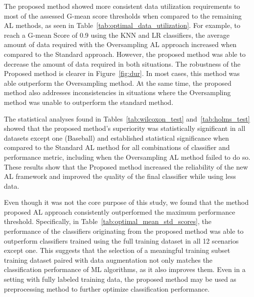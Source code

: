 \documentclass[preprint, 12pt]{elsarticle}
\begin{document}
The proposed method showed more consistent data utilization requirements to
most of the assessed G-mean score thresholds when compared to the remaining AL
methods, as seen in Table~\ref{tab:optimal_data_utilization}. For example, to
reach a G-mean Score of 0.9 using the KNN and LR classifiers, the average
amount of data required with the Oversampling AL approach increased when
compared to the Standard approach. However, the proposed method was able to
decrease the amount of data required in both situations. The robustness of the
Proposed method is clearer in Figure~\ref{fig:dur}. In most cases, this method
was able outperform the Oversampling method. At the same time, the
proposed method also addresses inconsistencies in situations where the
Oversampling method was unable to outperform the standard method.

The statistical analyses found in Tables~\ref{tab:wilcoxon_test}
and~\ref{tab:holms_test} showed that the proposed method's superiority was
statistically significant in all datasets except one (Baseball) and
established statistical significance when compared to the Standard AL method
for all combinations of classifier and performance metric, including when the
Oversampling AL method failed to do so. These results show that the Proposed
method increased the reliability of the new AL framework and improved the
quality of the final classifier while using less data.

Even though it was not the core purpose of this study, we found that the
method proposed AL approach consistently outperformed the maximum performance
threshold. Specifically, in Table~\ref{tab:optimal_mean_std_scores}, the
performance of the classifiers originating from the proposed method was able
to outperform classifiers trained using the full training dataset in all 12
scenarios except one. This suggests that the selection of a meaningful
training subset training dataset paired with data augmentation not only
matches the classification performance of ML algorithms, as it also improves
them. Even in a setting with fully labeled training data, the proposed method
may be used as preprocessing method to further optimize classification
performance.
\end{document}
